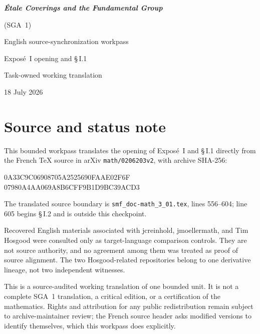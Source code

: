 \documentclass[11pt,oneside]{amsbook}
\begin{document}
\frontmatter
\begin{titlepage}
  \centering
  \vspace*{35mm}
  {\Huge\bfseries \textit{Étale Coverings and the Fundamental Group}\par}
  \vspace{3mm}
  {\LARGE (SGA~1)\par}
  \vspace{20mm}
  {\Large English source-synchronization workpass\par}
  \vspace{3mm}
  {\Large Exposé~I opening and \S\,I.1\par}
  \vfill
  {\large Task-owned working translation\par}
  \vspace{5mm}
  {\large 18 July 2026\par}
\end{titlepage}

\chapter*{Source and status note}

This bounded workpass translates the opening of Exposé~I and \S\,I.1 directly
from the French \TeX{} source in arXiv \texttt{math/0206203v2}, with archive
SHA-256:
\begin{center}
  \small\ttfamily
  0A33C9C06908705A2525690FAAE02F6F\\
  07980A4AA069A8B6CFF9B1D9BC39ACD3
\end{center}
The translated source boundary is
\texttt{smf\_doc-math\_3\_01.tex}, lines 556--604; line 605 begins \S\,I.2
and is outside this checkpoint.

Recovered English materials associated with jcreinhold, jmoellermath, and
Tim Hosgood were consulted only as target-language comparison controls.
They are not source authority, and no agreement among them was treated as
proof of source alignment.  The two Hosgood-related repositories belong to
one derivative lineage, not two independent witnesses.

This is a source-audited working translation of one bounded unit.  It is not
a complete SGA~1 translation, a critical edition, or a certification of the
mathematics.  Rights and attribution for any public redistribution remain
subject to archive-maintainer review; the French source header asks modified
versions to identify themselves, which this workpass does explicitly.
\end{document}
